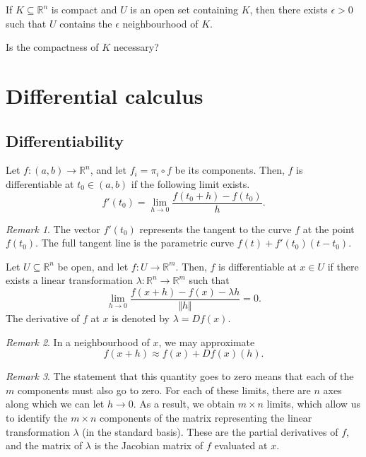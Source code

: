 \documentclass[11pt]{article}
\newcommand{\R}{\mathbb{R}}
\newcommand{\norm}[1]{\Vert #1 \Vert}
\theoremstyle{definition}
\theoremstyle{remark}
\newtheorem*{remark}{Remark}
\numberwithin{equation}{section}
\begin{document}
    \begin{exercise}
        If $K \subseteq \R^n$ is compact and $U$ is an open set containing $K$, then
        there exists $\epsilon > 0$ such that $U$ contains the $\epsilon$
        neighbourhood of $K$.

        Is the compactness of $K$ necessary?
    \end{exercise}
    
    \section{Differential calculus}
    
    \subsection{Differentiability}
    \begin{definition}
        Let $f \colon (a, b) \to \R^n$, and let $f_i = \pi_i\circ f$ be its
        components. Then, $f$ is differentiable at $t_0 \in (a, b)$ if the following
        limit exists. \[
            f'(t_0) = \lim_{h \to 0} \frac{f(t_0 + h) - f(t_0)}{h}.
        \] 
        \begin{remark}
            The vector $f'(t_0)$ represents the tangent to the curve $f$ at the point
            $f(t_0)$. The full tangent line is the parametric curve $f(t) + f'(t_0)(t
            - t_0)$.
        \end{remark}
    \end{definition}

    \begin{definition}
        Let $U \subseteq \R^n$ be open, and let $f\colon U \to \R^m$. Then, $f$ is
        differentiable at $x \in U$ if there exists a linear transformation
        $\lambda\colon \R^n \to \R^m$ such that \[
            \lim_{h \to 0} \frac{f(x + h) - f(x) - \lambda h}{\norm{h}} = 0.
        \] The derivative of $f$ at $x$ is denoted by $\lambda = Df(x)$.
        \begin{remark}
            In a neighbourhood of $x$, we may approximate \[
                f(x + h) \approx f(x) + Df(x)(h).
            \] 
        \end{remark}
        \begin{remark}
            The statement that this quantity goes to zero means that each of the $m$
            components must also go to zero. For each of these limits, there are $n$
            axes along which we can let $h \to 0$. As a result, we obtain $m\times n$
            limits, which allow us to identify the $m\times n$ components of the
            matrix representing the linear transformation $\lambda$ (in the standard
            basis). These are the partial derivatives of $f$, and the matrix of
            $\lambda$ is the Jacobian matrix of $f$ evaluated at $x$.
        \end{remark}
    \end{definition}
\end{document}
